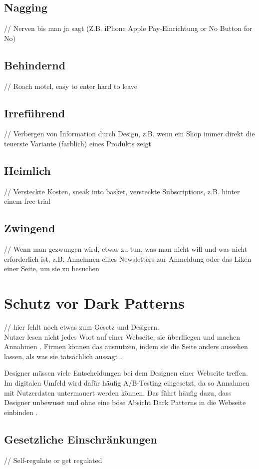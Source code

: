 \documentclass[conference,compsoc,final,a4paper]{IEEEtran}
\begin{document}
\subsection{Nagging}
// Nerven bis man ja sagt (Z.B. iPhone Apple Pay-Einrichtung or No Button for No)
\subsection{Behindernd}
// Roach motel, easy to enter hard to leave
\subsection{Irreführend}
\label{chap:Irreführend}
// Verbergen von Information durch Design, z.B. wenn ein Shop immer direkt die teuerste Variante (farblich) eines Produkts zeigt
\subsection{Heimlich}
// Versteckte Kosten, sneak into basket, versteckte Subscriptions, z.B. hinter einem free trial
\subsection{Zwingend}
// Wenn man gezwungen wird, etwas zu tun, was man nicht will und was nicht erforderlich ist, z.B. Annehmen eines Newsletters zur Anmeldung oder das Liken einer Seite, um sie zu besuchen


\section{Schutz vor Dark Patterns}
// hier fehlt noch etwas zum Gesetz und Desigern.\\
Nutzer lesen nicht jedes Wort auf einer Webseite, sie überfliegen und machen Annahmen \autocite{Brignull}. Firmen können das ausnutzen, indem sie die Seite anders aussehen lassen, als was sie tatsächlich aussagt \autocite{Brignull}.

Designer müssen viele Entscheidungen bei dem Designen einer Webseite treffen. Im digitalen Umfeld wird dafür häufig A/B-Testing eingesetzt, da so Annahmen mit Nutzerdaten untermauert werden können. Das führt häufig dazu, dass Designer unbewusst und ohne eine böse Absicht Dark Patterns in die Webseite einbinden \autocite{Narayanan2020}.

\subsection{Gesetzliche Einschränkungen}
// Self-regulate or get regulated
\end{document}
